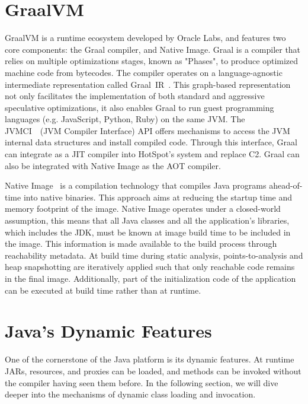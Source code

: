 \section{GraalVM}
GraalVM is a runtime ecosystem developed by Oracle Labs, and features two core components: the Graal compiler, and Native Image.
Graal is a compiler that relies on multiple optimizations stages, known as "Phases", to produce optimized machine code from bytecodes. The compiler operates on a language-agnostic intermediate representation called Graal~IR~\cite{duboscq_graal_nodate}. This graph-based representation not only facilitates the implementation of both standard and aggressive speculative optimizations, it also enables Graal to run guest programming languages (e.g. JavaScript, Python, Ruby) on the same JVM. 
The JVMCI~\cite{noauthor_jep_nodate}~(JVM Compiler Interface) API offers mechanisms to access the JVM internal data structures and install compiled code. Through this interface, Graal can integrate as a JIT compiler into HotSpot's system and replace C2. 
Graal can also be integrated with Native Image as the AOT compiler.

Native Image~\cite{wimmer_initialize_2019} is a compilation technology that compiles Java programs ahead-of-time into native binaries. This approach aims at reducing the startup time and memory footprint of the image. Native Image operates under a closed-world assumption, this means that all Java classes and all the application's libraries, which includes the JDK, must be known at image build time to be included in the image. This information is made available to the build process through reachability metadata. 
At build time during static analysis, points-to-analysis and heap snapshotting are iteratively applied such that only reachable code remains in the final image. Additionally, part of the initialization code of the application can be executed at build time rather than at runtime.


\section{Java's Dynamic Features}
One of the cornerstone of the Java platform is its dynamic features. At runtime JARs, resources, and proxies can be loaded, and methods can be invoked without the compiler having seen them before. In the following section, we will dive deeper into the mechanisms of dynamic class loading and invocation.


